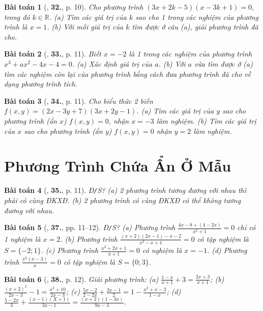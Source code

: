 \documentclass{article}
\numberwithin{equation}{section}
\newtheorem{baitoan}{Bài toán}
\begin{document}
\begin{baitoan}[\cite{SBT_Toan_8_tap_2}, \textbf{32.}, p. 10]
	Cho phương trình $(3x + 2k - 5)(x - 3k + 1) = 0$, trong đó $k\in\mathbb{R}$. (a) Tìm các giá trị của $k$ sao cho 1 trong các nghiệm của phương trình là $x = 1$. (b) Với mỗi giá trị của $k$ tìm được ở câu (a), giải phương trình đã cho.
\end{baitoan}

\begin{baitoan}[\cite{SBT_Toan_8_tap_2}, \textbf{33.}, p. 11]
	Biết $x = -2$ là 1 trong các nghiệm của phương trình $x^3 + ax^2 - 4x - 4 = 0$. (a) Xác định giá trị của $a$. (b) Với $a$ vừa tìm được ở (a) tìm các nghiệm còn lại của phương trình bằng cách đưa phương trình đã cho về dạng phương trình tích.
\end{baitoan}

\begin{baitoan}[\cite{SBT_Toan_8_tap_2}, \textbf{34.}, p. 11]
	Cho biểu thức 2 biến $f(x,y) = (2x - 3y + 7)(3x + 2y - 1)$. (a) Tìm các giá trị của $y$ sao cho phương trình (ẩn $x$) $f(x,y) = 0$, nhận $x = -3$ làm nghiệm. (b) Tìm các giá trị của $x$ sao cho phương trình (ẩn $y$) $f(x,y) = 0$ nhận $y = 2$ làm nghiệm.
\end{baitoan}


\section{Phương Trình Chứa Ẩn Ở Mẫu}

\begin{baitoan}[\cite{SBT_Toan_8_tap_2}, \textbf{35.}, p. 11]
	\emph{Đ\texttt{/}S?} (a) 2 phương trình tương đương với nhau thì phải có cùng ĐKXĐ. (b) 2 phương trình có cùng ĐKXĐ có thể không tương đương với nhau.
\end{baitoan}

\begin{baitoan}[\cite{SBT_Toan_8_tap_2}, \textbf{37.}, pp. 11--12]
	\emph{Đ\texttt{/}S?} (a) Phương trình $\frac{4x - 8 + (4 - 2x)}{x^2 + 1} = 0$ chỉ có 1 nghiệm là $x = 2$. (b) Phương trình $\frac{(x + 2)(2x - 1) - x - 2}{x^2 - x + 1} = 0$ có tập nghiệm là $S = \{-2;1\}$. (c) Phương trình $\frac{x^2 + 2x + 1}{x + 1} = 0$ có nghiệm là $x = -1$. (d) Phương trình $\frac{x^2(x - 3)}{x} = 0$ có tập nghiệm là $S = \{0;3\}$.
\end{baitoan}

\begin{baitoan}[\cite{SBT_Toan_8_tap_2}, \textbf{38.}, p. 12]
	Giải phương trình: (a) $\frac{1 - x}{x + 1} + 3 = \frac{2x + 3}{x + 1}$; (b) $\frac{(x + 2)^2}{2x - 3} - 1 = \frac{x^2 + 10}{2x - 3}$; (c) $\frac{5x - 2}{2 - 2x} + \frac{2x - 1}{2} = 1 - \frac{x^2 + x - 3}{1 - x}$; (d) $\frac{5 - 2x}{3} + \frac{(x - 1)(X + 1)}{3x - 1} = \frac{(x + 2)(1 - 3x)}{9x - 3}$.
\end{baitoan}
\end{document}
